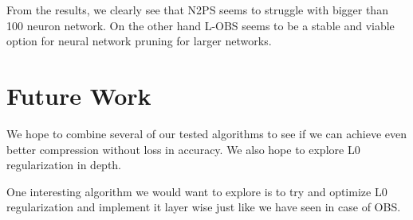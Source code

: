 \documentclass{article}
\begin{document}
From the results, we clearly see that N2PS seems to struggle with bigger than 100 neuron network. On the other hand L-OBS seems to be a stable and viable option for neural network pruning for larger networks. 

\section{Future Work}
\label{Future Work}

We hope to combine several of our tested algorithms to see if we can achieve even better compression without loss in accuracy. We also hope to explore L0 regularization in depth. 

One interesting algorithm we would want to explore is to try and optimize L0 regularization and implement it layer wise just like we have seen in case of OBS.


\newpage



\end{document}
